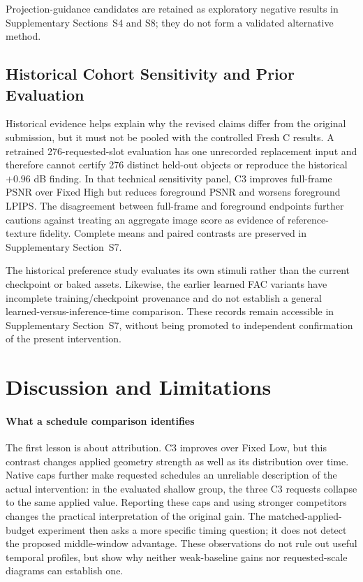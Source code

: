 \documentclass[times,twocolumn,final]{elsarticle}
\begin{document}
Projection-guidance candidates are retained as exploratory negative results in Supplementary Sections~S4 and S8; they do not form a validated alternative method.

\subsection{Historical Cohort Sensitivity and Prior Evaluation}
\label{subsec:original276}

Historical evidence helps explain why the revised claims differ from the original submission, but it must not be pooled with the controlled Fresh C results. A retrained 276-requested-slot evaluation has one unrecorded replacement input and therefore cannot certify 276 distinct held-out objects or reproduce the historical $+0.96$ dB finding. In that technical sensitivity panel, C3 improves full-frame PSNR over Fixed High but reduces foreground PSNR and worsens foreground LPIPS. The disagreement between full-frame and foreground endpoints further cautions against treating an aggregate image score as evidence of reference-texture fidelity. Complete means and paired contrasts are preserved in Supplementary Section~S7.

The historical preference study evaluates its own stimuli rather than the current checkpoint or baked assets. Likewise, the earlier learned FAC variants have incomplete training/checkpoint provenance and do not establish a general learned-versus-inference-time comparison. These records remain accessible in Supplementary Section~S7, without being promoted to independent confirmation of the present intervention.



\section{Discussion and Limitations}
\label{sec:limitations}

\paragraph{What a schedule comparison identifies}
The first lesson is about attribution. C3 improves over Fixed Low, but this contrast changes applied geometry strength as well as its distribution over time. Native caps further make requested schedules an unreliable description of the actual intervention: in the evaluated shallow group, the three C3 requests collapse to the same applied value. Reporting these caps and using stronger competitors changes the practical interpretation of the original gain. The matched-applied-budget experiment then asks a more specific timing question; it does not detect the proposed middle-window advantage. These observations do not rule out useful temporal profiles, but show why neither weak-baseline gains nor requested-scale diagrams can establish one.
\end{document}
